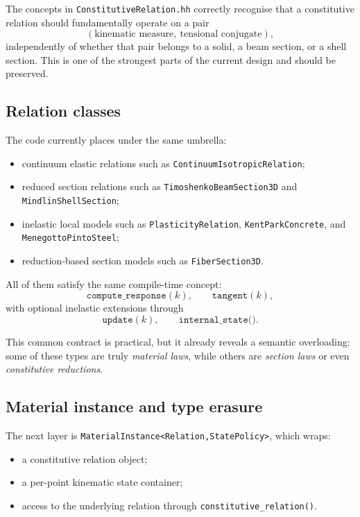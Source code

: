 The concepts in \texttt{ConstitutiveRelation.hh} correctly recognise that a
constitutive relation should fundamentally operate on a pair
\[
(\text{kinematic measure},\ \text{tensional conjugate}),
\]
independently of whether that pair belongs to a solid, a beam section, or a
shell section.  This is one of the strongest parts of the current design and
should be preserved.

\subsection{Relation classes}

The code currently places under the same umbrella:
\begin{itemize}
  \item continuum elastic relations such as
        \texttt{ContinuumIsotropicRelation};
  \item reduced section relations such as
        \texttt{TimoshenkoBeamSection3D} and \texttt{MindlinShellSection};
  \item inelastic local models such as
        \texttt{PlasticityRelation}, \texttt{KentParkConcrete}, and
        \texttt{MenegottoPintoSteel};
  \item reduction-based section models such as \texttt{FiberSection3D}.
\end{itemize}

All of them satisfy the same compile-time concept:
\[
\texttt{compute\_response}(k), \qquad
\texttt{tangent}(k),
\]
with optional inelastic extensions through
\[
\texttt{update}(k), \qquad
\texttt{internal\_state()}.
\]

This common contract is practical, but it already reveals a semantic
overloading: some of these types are truly \emph{material laws}, while others
are \emph{section laws} or even \emph{constitutive reductions}.

\subsection{Material instance and type erasure}

The next layer is \texttt{MaterialInstance<Relation,StatePolicy>}, which wraps:
\begin{itemize}
  \item a constitutive relation object;
  \item a per-point kinematic state container;
  \item access to the underlying relation through
        \texttt{constitutive\_relation()}.
\end{itemize}

